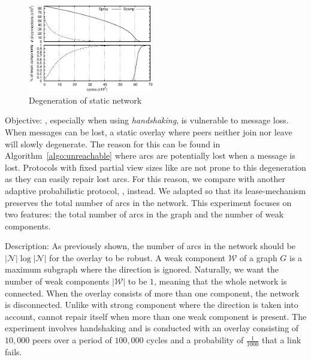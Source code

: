 \begin{figure}
  \centering \includegraphics[width=0.49\textwidth]{img/degen.eps}
  \caption{\label{fig:degen}Degeneration of static network} \end{figure}

\begin{asparadesc} \item[Objective:] \SCAMPLON{}, especially when using
        \emph{handshaking}, is vulnerable to message loss. When messages can
        be lost, a static \SCAMPLON{} overlay where peers neither join
        nor leave will slowly degenerate.
        The reason for this can be found in Algorithm~\ref{algo:unreachable} 
        where arcs are potentially lost when a message is lost.
        Protocols with fixed partial view sizes like \CYCLON{} are not prone 
        to this degeneration as they can easily repair lost arcs.
        For this reason, we compare with another adaptive probabilistic protocol,
        \SCAMP{}, instead. We adapted \SCAMP{} so that its lease-mechanism preserves
        the total number of arcs in the network.
        This experiment focuses on two features: the total number of arcs in the 
        graph and the number of weak components.
\item[Description:]
    As previously shown, the number of arcs in the network should be
    $|\mathcal{N}|\log{|\mathcal{N}|}$ for the overlay to be robust. A weak
    component $\mathcal{W}$ of a graph $G$ is a maximum subgraph where the direction
    is ignored.
    Naturally, we want the number of weak components $|\mathcal{W}|$ to be $1$,
    meaning that the whole network is connected.
    When the overlay consists of more than one component, the network is disconnected.
    Unlike with strong component where the direction is taken into account, \SCAMPLON{}
    cannot repair itself when more than one weak component is present.
    The experiment involves handshaking and is conducted with an overlay consisting
    of $10,000$ peers over a period of $100,000$ cycles and a probability of
    $\frac{1}{1000}$ that a link fails. 


\end{asparadesc}
